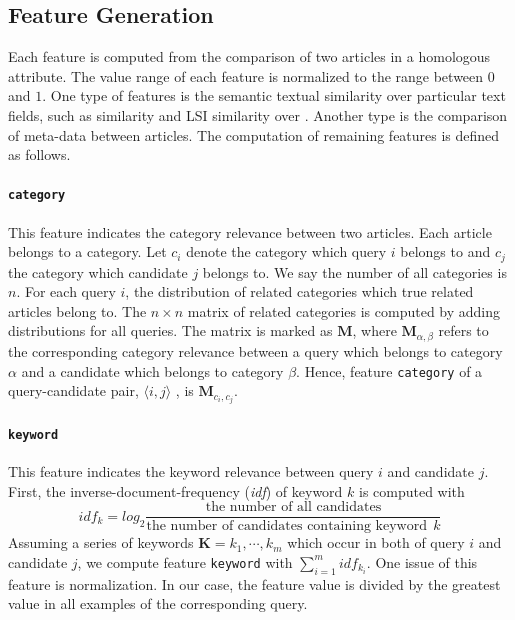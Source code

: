 \subsection{Feature Generation}
\label{sec:6.2}

Each feature is computed from the comparison of two articles in a homologous attribute. The value range of each feature is normalized to the range between $0$ and $1$. One type of features is the semantic textual similarity over particular text fields, such as \tfidf{} similarity and LSI similarity over \icontent{}. Another type is the comparison of meta-data between articles. The computation of remaining features is defined as follows.

\paragraph{\texttt{category}}

This feature indicates the category relevance between two articles. Each article belongs to a category. Let $c_i$ denote the category which query $i$ belongs to and $c_j$ the category which candidate $j$ belongs to. We say the number of all categories is $n$. For each query $i$, the distribution of related categories which true related articles belong to. The $n\times n$ matrix of related categories is computed by adding distributions for all queries. The matrix is marked as $\mathbf{M}$, where $\mathbf{M}_{\alpha,\beta}$ refers to the corresponding category relevance between a query which belongs to category $\alpha$ and a candidate which belongs to category $\beta$. Hence, feature \texttt{category} of a query-candidate pair, $\langle i, j \rangle$ , is $\mathbf{M}_{c_i, c_j}$.

\paragraph{\texttt{keyword}}

This feature indicates the keyword relevance between query $i$ and candidate $j$. First, the inverse-document-frequency (\textit{idf}) of keyword $k$ is computed with $$idf_k=log_2 \dfrac{\text{the number of all candidates}}{\text{the number of candidates containing keyword}~~k}$$ Assuming a series of keywords $\mathbf{K}={k_1, \cdots, k_m}$ which occur in both of query $i$ and candidate $j$, we compute feature \texttt{keyword} with $\sum_{i=1}^{m} idf_{k_i}$. One issue of this feature is normalization. In our case, the feature value is divided by the greatest value in all examples of the corresponding query. 

